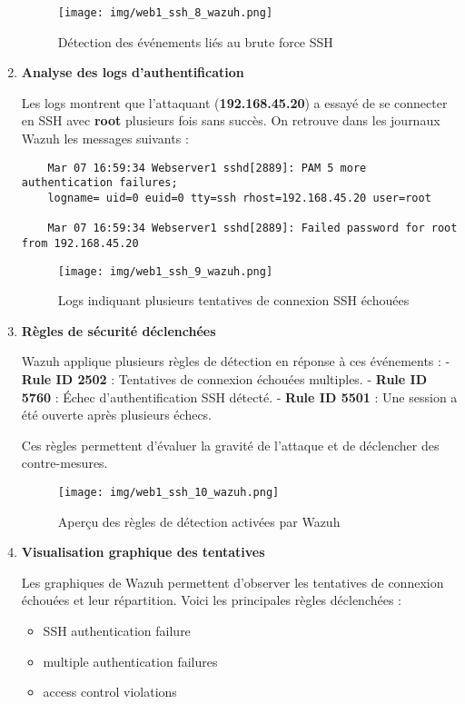 \documentclass[a4paper,12pt]{report}
\begin{document}
\begin{enumerate}
    \begin{figure}[h]
        \centering
        \texttt{[image: img/web1\_ssh\_8\_wazuh.png]}
        \caption{Détection des événements liés au brute force SSH}
    \end{figure}

    \item \textbf{Analyse des logs d'authentification}  

    Les logs montrent que l'attaquant (\textbf{192.168.45.20}) a essayé de se connecter en SSH avec \textbf{root} plusieurs fois sans succès. On retrouve dans les journaux Wazuh les messages suivants :

    \begin{lstlisting}
    Mar 07 16:59:34 Webserver1 sshd[2889]: PAM 5 more authentication failures;
    logname= uid=0 euid=0 tty=ssh rhost=192.168.45.20 user=root

    Mar 07 16:59:34 Webserver1 sshd[2889]: Failed password for root from 192.168.45.20
    \end{lstlisting}

    \begin{figure}[h]
        \centering
        \texttt{[image: img/web1\_ssh\_9\_wazuh.png]}
        \caption{Logs indiquant plusieurs tentatives de connexion SSH échouées}
    \end{figure}

    \item \textbf{Règles de sécurité déclenchées}  

    Wazuh applique plusieurs règles de détection en réponse à ces événements :
    - \textbf{Rule ID 2502} : Tentatives de connexion échouées multiples.
    - \textbf{Rule ID 5760} : Échec d'authentification SSH détecté.
    - \textbf{Rule ID 5501} : Une session a été ouverte après plusieurs échecs.

    Ces règles permettent d’évaluer la gravité de l’attaque et de déclencher des contre-mesures.

    \begin{figure}[H]
        \centering
        \texttt{[image: img/web1\_ssh\_10\_wazuh.png]}
        \caption{Aperçu des règles de détection activées par Wazuh}
    \end{figure}

    \item \textbf{Visualisation graphique des tentatives}  

    Les graphiques de Wazuh permettent d'observer les tentatives de connexion échouées et leur répartition. Voici les principales règles déclenchées :
    \begin{itemize}
        \item SSH authentication failure
    \item  multiple authentication failures
    \item  access control violations
    \end{itemize}
    


\end{enumerate}
\end{document}
